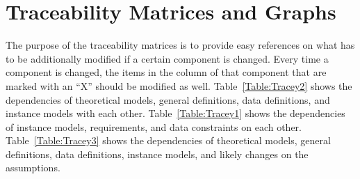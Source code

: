 \documentclass[12pt]{article}
\begin{document}
\section{Traceability Matrices and Graphs}
\label{Sec:TraceMatrices}
The purpose of the traceability matrices is to provide easy references on what has to be additionally modified if a certain component is changed. Every time a component is changed, the items in the column of that component that are marked with an ``X'' should be modified as well. Table~\ref{Table:Tracey2} shows the dependencies of theoretical models, general definitions, data definitions, and instance models with each other. Table~\ref{Table:Tracey1} shows the dependencies of instance models, requirements, and data constraints on each other. Table~\ref{Table:Tracey3} shows the dependencies of theoretical models, general definitions, data definitions, instance models, and likely changes on the assumptions.
\end{document}
